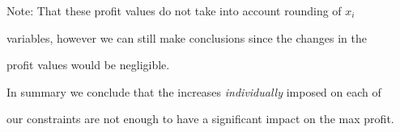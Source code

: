 \documentclass{article}
\begin{document}
\begin{table}[h]
    \centering
    \caption{Profit (z) given increase in cooling conditions}
    \label{tab:cooling_conditions}
\end{table}

\begin{table}[h]
    \centering
    \caption{Profit (z) given increase in demand conditions}
    \label{tab:demand_conditions}
\end{table}

Note: That these profit values do not take into account rounding of $x_i$ 

variables, however we can still make conclusions since the changes in the 

profit values would be negligible.

\vspace{\baselineskip}

In summary we conclude that the increases \textit{individually} imposed on each of 

our constraints are not enough to have a significant impact on the max profit.


\newpage
\end{document}
